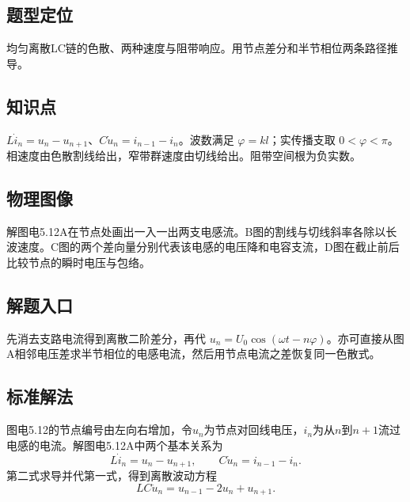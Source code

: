 \documentclass[UTF8,fontset=fandol,a4paper,11pt]{ctexart}
\begin{document}


\subsection*{题型定位}

均匀离散LC链的色散、两种速度与阻带响应。用节点差分和半节相位两条路径推导。



\subsection*{知识点}

$L\dot i_n=u_n-u_{n+1}$、$C\dot u_n=i_{n-1}-i_n$。波数满足 $\varphi=kl$；实传播支取 $0<\varphi<\pi$。相速度由色散割线给出，窄带群速度由切线给出。阻带空间根为负实数。



\subsection*{物理图像}

解图电5.12A在节点处画出一入一出两支电感流。B图的割线与切线斜率各除以长波速度。C图的两个差向量分别代表该电感的电压降和电容支流，D图在截止前后比较节点的瞬时电压与包络。



\subsection*{解题入口}

先消去支路电流得到离散二阶差分，再代 $u_n=U_0\cos(\omega t-n\varphi)$。亦可直接从图A相邻电压差求半节相位的电感电流，然后用节点电流之差恢复同一色散式。


\subsection*{标准解法}


图电5.12的节点编号由左向右增加，令$u_n$为节点对回线电压，$i_n$为从$n$到$n+1$流过电感的电流。解图电5.12A中两个基本关系为
\[
 L\dot i_n=u_n-u_{n+1},\qquad
 C\dot u_n=i_{n-1}-i_n.
\]
第二式求导并代第一式，得到离散波动方程
\[
 LC\ddot u_n=u_{n-1}-2u_n+u_{n+1}.
\]
\end{document}
